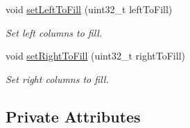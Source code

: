\begin{DoxyCompactItemize}
void \hyperlink{classfi_1_1HTGSTileRequestData_afd11844eed997810eb72b25536be45f7}{set\+Left\+To\+Fill} (uint32\+\_\+t left\+To\+Fill)
\begin{DoxyCompactList}\small\item\em Set left columns to fill. \end{DoxyCompactList}\item 
void \hyperlink{classfi_1_1HTGSTileRequestData_af67ee5f1c57cde25ba6aa0d1a3b9fb64}{set\+Right\+To\+Fill} (uint32\+\_\+t right\+To\+Fill)
\begin{DoxyCompactList}\small\item\em Set right columns to fill. \end{DoxyCompactList}\end{DoxyCompactItemize}
\subsection*{Private Attributes}
